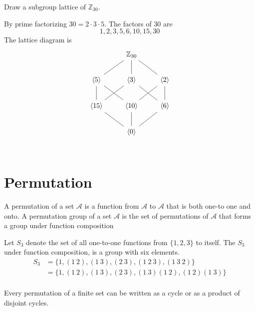 \begin{example}
    Draw a subgroup lattice of $\mathbb{Z}_{30}$.
\end{example}
\begin{solution}
    By prime factorizing $30 = 2 \cdot 3 \cdot 5$. The factors of $30$ are
    \[
    1, 2, 3, 5, 6, 10, 15, 30
    \]
    The lattice diagram is 
    \[
        \begin{tikzcd}[row sep=2.0em]
            & \mathbb{Z}_{30} \arrow[dash]{dl} \arrow[dash]{d} \arrow[dash]{dr}& \\
            \langle 5 \rangle  \arrow[dash]{d}  \arrow[dash]{dr}& \langle 3 \rangle  \arrow[dash]{dl} \arrow[dash]{dr} & \langle 2 \rangle \arrow[dash]{dl} \arrow[dash]{d}\\
            \langle 15 \rangle  \arrow[dash]{dr} & \langle 10 \rangle  \arrow[dash]{d} & \langle 6 \rangle \arrow[dash]{dl}\\
            & \langle 0 \rangle & \\
        \end{tikzcd}
    \]
\end{solution}

\section{Permutation}

\begin{definition}
    A permutation of a set $\mathcal{A}$ is a function from $\mathcal{A}$ to $\mathcal{A}$ that is both one-to
one and onto. A permutation group of a set $\mathcal{A}$ is the set of permutations of $\mathcal{A}$ that 
forms a group under function composition
\end{definition}

\begin{example}
    Let $S_3$ denote the set of all one-to-one functions from $\{1, 2, 3\}$ to itself. The 
    $S_3$ under function composition, is a group with six elements.
    \begin{align*}
        S_3 &= \{ 1, (1\> 2), (1 \> 3), (2 \> 3), (1 \> 2 \> 3), (1 \> 3 \> 2) \} \\ 
        &= \{ 1, (1\> 2), (1 \> 3), (2 \> 3), (1 \> 3)(1 \> 2), (1 \> 2) (1 \> 3)\} \\
    \end{align*}
\end{example}

\begin{lemma}
    Every permutation of a finite set can be written as a cycle or as a product of disjoint cycles.
\end{lemma}

